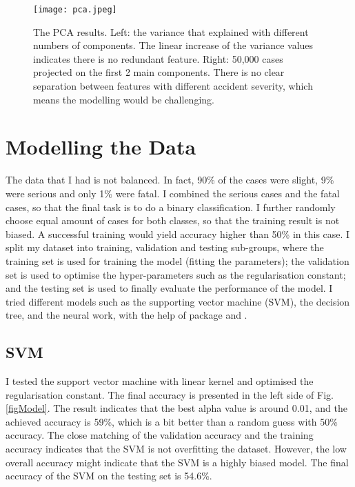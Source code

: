 \documentclass[12pt,a4paper]{article}
\begin{document}
\begin{figure}[!ht]
    \centering
    \texttt{[image: pca.jpeg]}
    \caption{The PCA results. Left: the variance that explained with different numbers of components. The linear increase of the variance values indicates there is no redundant feature. Right: 50,000 cases projected on the first 2 main components. There is no clear separation between features with different accident severity, which means the modelling would be challenging.}
    \label{figPCA}
\end{figure}

\newpage

\section{Modelling the Data}

The data that I had is not balanced. In fact, 90\% of the cases were slight, 9\% were serious and only 1\% were fatal. I combined the serious cases and the fatal cases, so that the final task is to do a binary classification. I further randomly choose equal amount of cases for both classes, so that the training result is not biased. A successful training would yield accuracy higher than 50\% in this case. I split my dataset into training, validation and testing sub-groups, where the training set is used for training the model (fitting the parameters); the validation set is used to optimise the hyper-parameters such as the regularisation constant; and the testing set is used to finally evaluate the performance of the model. I tried different models such as the supporting vector machine (SVM), the decision tree, and the neural work, with the help of package  and . 

\subsection{SVM}

I tested the support vector machine with linear kernel and optimised the regularisation constant. The final accuracy is presented in the left side of Fig. \ref{figModel}. The result indicates that the best alpha value is around 0.01, and the achieved accuracy is 59\%, which is a bit better than a random guess with 50\% accuracy. The close matching of the validation accuracy and the training accuracy indicates that the SVM is not overfitting the dataset. However, the low overall accuracy might indicate that the SVM is a highly biased model. The final accuracy of the SVM on the testing set is 54.6\%.
\end{document}
